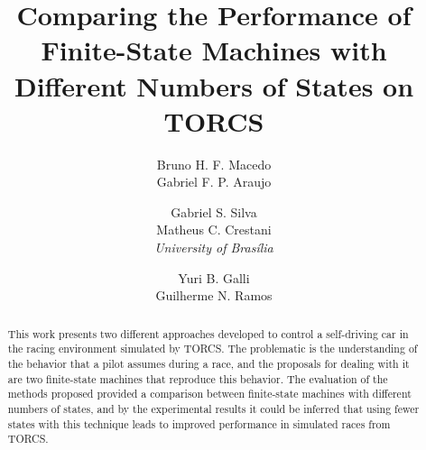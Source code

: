 \documentclass[a4paper]{sbgames}
\title{Comparing the Performance of Finite-State Machines with Different Numbers of States on TORCS}
\author{Bruno H. F. Macedo\\Gabriel F. P. Araujo\\
		\and Gabriel S. Silva\\Matheus C. Crestani\\\textit{University of Bras\'{i}lia}
		\and Yuri B. Galli\\ Guilherme N. Ramos\\
}
\begin{document}
	\maketitle

	\begin{abstract}
		
		This work presents two different approaches developed to control a self-driving car in the racing environment simulated by TORCS. The problematic is the understanding of the behavior that a pilot assumes during a race, and the proposals for dealing with it are two finite-state machines that reproduce this behavior. The evaluation of the methods proposed provided a comparison between finite-state machines with different numbers of states, and by the experimental results it could be inferred that using fewer states with this technique leads to improved performance in simulated races from TORCS.
		
	\end{abstract}

	\keywordlist
	\contactlist
	
	
	
	
	
	

	
	
	
	
\end{document}
